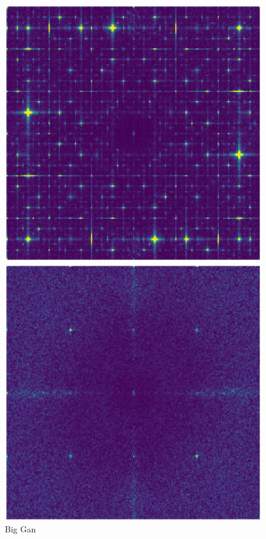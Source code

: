 \documentclass[fleqn,compress,utf8,aspectratio=169,t,handout]{beamer}
\begin{document}
\begin{frame}
	\begin{figure}[h]
    \centering
    \begin{minipage}{0.3\textwidth}
      \includegraphics[width = 0.9 \textwidth]{figs/resfft_biggan.png}
      \caption{Big Gan}
    \end{minipage}
    \hfill
    \pause
		\begin{minipage}{0.3\textwidth}
      \includegraphics[width = 0.9 \textwidth]{figs/resfft_glide_text2img.png}

\end{minipage}
\end{figure}
\end{frame}
\end{document}
